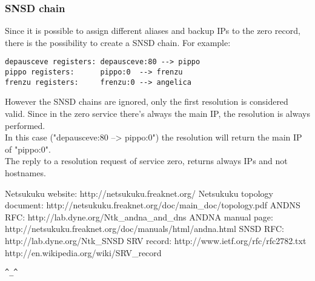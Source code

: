 \documentclass[a4paper]{article}
\newcommand{\href}[2]{ #1 }
\begin{document}
\subsubsection{SNSD chain}

Since it is possible to assign different aliases and backup IPs to the zero
record, there is the possibility to create a SNSD chain.
For example:

\begin{verbatim}
depausceve registers: depausceve:80 --> pippo
pippo registers:      pippo:0  --> frenzu
frenzu registers:     frenzu:0 --> angelica
\end{verbatim}

However the SNSD chains are ignored, only the first resolution is considered
valid. Since in the zero service there's always the main IP, the resolution is
always performed.\\
In this case ("depausceve:80 --> pippo:0") the resolution will return the main
IP of "pippo:0".\\

The reply to a resolution request of service zero, returns always IPs and not
hostnames.


\begin{thebibliography}{99}
	 Netsukuku website:
		\href{http://netsukuku.freaknet.org/}{http://netsukuku.freaknet.org/}
	 Netsukuku topology document:
		\href{http://netsukuku.freaknet.org/doc/main\_doc/topology.pdf}{topology.pdf}
	 ANDNS RFC:
		\href{http://lab.dyne.org/Ntk\_andna\_and\_dns}{Andna and dns}
	 ANDNA manual page:
		\href{http://netsukuku.freaknet.org/doc/manuals/html/andna.html}{andna(8)}
	 SNSD RFC:
		\href{http://lab.dyne.org/Ntk\_SNSD}{SNSD}
	 SRV record:
		\href{http://www.ietf.org/rfc/rfc2782.txt}{RFC 2782}\\
		\href{http://en.wikipedia.org/wiki/SRV\_record}{SRV on wikipedia}
\end{thebibliography}
\newpage

\begin{center}
\verb|^_^|
\end{center}
\end{document}
